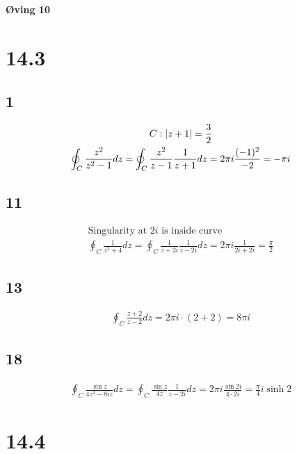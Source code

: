 \begin{center}
	\LARGE{\textbf{Øving 10}}
\end{center}


\section*{14.3}

\subsection*{1}


\begin{gather*}
	C : \left| z + 1 \right| = \frac{3}{2}
	\\
	\oint_{C}{\frac{z^2}{z^2 - 1} dz}
	=
	\oint_{C}{\frac{z^2}{z - 1} \frac{1}{z + 1} dz} = 2 \pi i \frac{(-1)^2}{-2} = -\pi i
\end{gather*}


\subsection*{11}


\begin{gather*}
	\text{Singularity at } 2i \text{ is inside curve}
	\\
	\oint_C{\frac{1}{z^2 + 4} dz} = \oint_C{\frac{1}{z + 2 i} \frac{1}{z - 2i} dz} = 2 \pi i \frac{1}{2 i + 2 i} = \frac{\pi}{2}
\end{gather*}


\subsection*{13}


\begin{gather*}
	\oint_C{\frac{z + 2}{z - 2} dz} = 2 \pi i \cdot (2 + 2) = 8 \pi i
\end{gather*}


\subsection*{18}


\begin{gather*}
	\oint_C{\frac{\sin{z}}{4 z^2 - 8 i z} dz} = \oint_C{\frac{\sin{z}}{4 z} \frac{1}{z - 2 i} dz} = 2 \pi i \frac{\sin{2 i}}{4 \cdot 2 i} = \frac{\pi}{4} i \sinh{2}
\end{gather*}


\section*{14.4}

